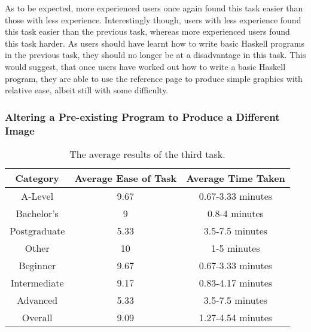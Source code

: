 \documentclass[../main.tex]{subfiles}
\begin{document}
                As to be expected, more experienced users once again found this task easier
                    than those with less experience.
                Interestingly though, users with less experience found this task easier than
                    the previous task, whereas more experienced users found this task harder.
                As users should have learnt how to write basic Haskell programs in the previous
                    task, they should no longer be at a disadvantage in this task.
                This would suggest, that once users have worked out how to write a basic
                    Haskell program, they are able to use the reference page to produce simple
                    graphics with relative ease, albeit still with some difficulty.

            \subsubsection{Altering a Pre-existing Program to Produce a Different Image}
                \begin{table}[H]
                    \centering
                    \begin{tabular}{c|c|c}
                        \textbf{Category} & \textbf{Average Ease of Task} & \textbf{Average Time Taken} \\
                        \hline
                        A-Level           & 9.67                          & 0.67-3.33 minutes           \\
                        Bachelor's        & 9                             & 0.8-4 minutes               \\
                        Postgraduate      & 5.33                          & 3.5-7.5 minutes             \\
                        Other             & 10                            & 1-5 minutes                 \\
                        \hline
                        Beginner          & 9.67                          & 0.67-3.33 minutes           \\
                        Intermediate      & 9.17                          & 0.83-4.17 minutes           \\
                        Advanced          & 5.33                          & 3.5-7.5 minutes             \\
                        \hline
                        Overall           & 9.09                          & 1.27-4.54 minutes           \\
                    \end{tabular}
                    \caption{The average results of the third task.}
                \end{table}
\end{document}
